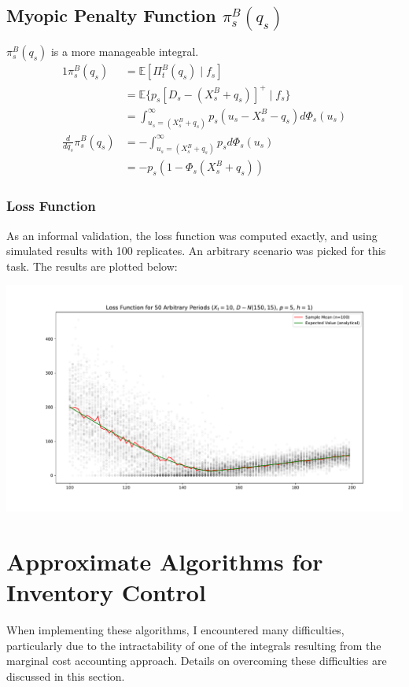 \documentclass[12pt]{report}
\newcommand{\EX}{\mathbb{E}}
\begin{document}
\subsection{Myopic Penalty Function $\pi_s^B(q_s)$}

$\pi_s^B(q_s)$ is a more manageable integral.
\begin{alignat}{1}
	\pi_s^B(q_s) &= \EX [\Pi_t^B(q_s) \; | \; f_s] \nonumber \\
		&= \EX \bigg\{ p_s [D_s - (X_s^B + q_s)]^+  \; | \; f_s \bigg\} \nonumber \\
		&= \int_{u_s=({X_s^B + q_s})}^{\infty} p_s (u_s - X_s^B - q_s) d\Phi_s(u_s) \\
	\frac{d}{d q_s} \pi_s^B(q_s) &=  - \int_{u_s=({X_s^B + q_s})}^{\infty} p_s d\Phi_s(u_s) \nonumber \\
		&= - p_s (1 - \Phi_s(X_s^B + q_s)) 
\end{alignat}

\subsubsection{Loss Function}

As an informal validation, the loss function was computed exactly, and using simulated results with 100 replicates. An arbitrary scenario was picked for this task. The results are plotted below:

\includegraphics[width=\textwidth]{loss.pdf}

\section{Approximate Algorithms for Inventory Control}

When implementing these algorithms, I encountered many difficulties, particularly due to the intractability of one of the integrals resulting from the marginal cost accounting approach. Details on overcoming these difficulties are discussed in this section. 
\end{document}
